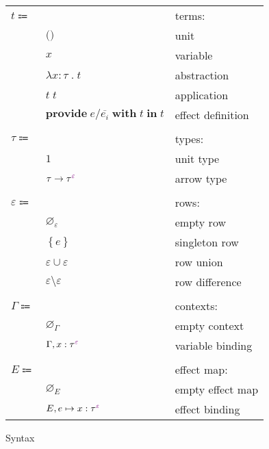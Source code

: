 \documentclass[12pt]{article}
\newcommand\anno[2]{#1 : #2}
\newcommand\term{t}
\newcommand\eUnit{\texttt{()}}
\newcommand\eVar{x}
\newcommand\eAbs[2]{\lambda #1 \; . \; #2}
\newcommand\eApp[2]{#1 \; #2}
\newcommand\eProvide[4]{\textbf{provide} \; #1 / #2 \; \textbf{with} \; #3 \; \textbf{in} \; #4}
\newcommand\type{\tau}
\newcommand\tUnit{1}
\newcommand\tArrow[2]{#1 \rightarrow #2}
\newcommand\tEmbellished[2]{{#1}^{\textcolor{violet}{#2}}}
\newcommand\row{\varepsilon}
\newcommand\rEmpty{\varnothing_{\row}}
\newcommand\rSingleton[1]{\left\{ #1 \right\}}
\newcommand\rUnion[2]{#1 \cup #2}
\newcommand\rDiff[2]{#1 \setminus #2}
\newcommand\context{\Gamma}
\newcommand\cEmpty{\varnothing_{\context}}
\newcommand\cExtend[2]{#1, #2}
\newcommand\effect{e}
\newcommand\effectMap{E}
\newcommand\emMap[2]{#1 \mapsto #2}
\newcommand\emEmpty{\varnothing_{\effectMap}}
\newcommand\emExtend[2]{#1, #2}
\begin{document}
      \begin{figure}[H]
        \begin{mdframed}[backgroundcolor=none]
          \begin{center}
            \begin{tabular}{l l l}
              $\term \Coloneqq $ & & terms: \\
              & $\eUnit$ & unit \\
              & $\eVar$ & variable \\
              & $\eAbs{\anno{\eVar}{\type}}{\term}$ & abstraction \\
              & $\eApp{\term}{\term}$ & application \\
              & $\eProvide{\effect}{\overline{\effect_i}}{\term}{\term}$ & effect definition \\
              \\
              $\type \Coloneqq$ & & types: \\
              & $\tUnit$ & unit type \\
              & $\tArrow{\type}{\tEmbellished{\type}{\row}}$ & arrow type \\
              \\
              $\row \Coloneqq$ & & rows: \\
              & $\rEmpty$ & empty row \\
              & $\rSingleton{\effect}$ & singleton row \\
              & $\rUnion{\row}{\row}$ & row union \\
              & $\rDiff{\row}{\row}$ & row difference \\
              \\
              $\context \Coloneqq$ & & contexts: \\
              & $\cEmpty$ & empty context \\
              & $\cExtend{\context}{\anno{\eVar}{\tEmbellished{\type}{\row}}}$ & variable binding \\
              \\
              $\effectMap \Coloneqq$ & & effect map: \\
              & $\emEmpty$ & empty effect map \\
              & $\emExtend{\effectMap}{\emMap{\effect}{\anno{\eVar}{\tEmbellished{\type}{\row}}}}$ & effect binding \\
            \end{tabular}
          \end{center}

          \caption{Syntax}\label{fig:syntax}
        \end{mdframed}
      \end{figure}
\end{document}
